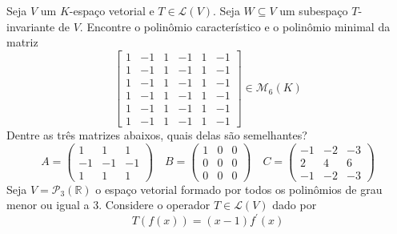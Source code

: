 \documentclass[11pt,a4paper]{article}
\begin{document}
 Seja $V$ um $K$-espaço vetorial e $T \in \mathcal{L}(V).$ Seja $W \subseteq V$ um subespaço $T$-invariante de $V.$
\solucao{}
 Encontre o polinômio característico e o polinômio minimal da matriz
\[
\begin{bmatrix}
1 & -1 & 1 & -1 & 1 & -1 \\
1 & -1 & 1 & -1 & 1 & -1 \\
1 & -1 & 1 & -1 & 1 & -1 \\
1 & -1 & 1 & -1 & 1 & -1 \\
1 & -1 & 1 & -1 & 1 & -1 \\
1 & -1 & 1 & -1 & 1 & -1
\end{bmatrix} \in \mathcal{M}_6(K)
\]
\solucao{}
 Dentre as três matrizes abaixos, quais delas são semelhantes?
\[
A = \begin{pmatrix}
1 & 1 & 1 \\
-1& -1 & -1 \\
1 & 1 & 1
\end{pmatrix}  \quad B = \begin{pmatrix}
1 & 0 & 0 \\
0& 0 & 0 \\
0 & 0 &0
\end{pmatrix} \quad C = \begin{pmatrix}
-1 & -2 & -3 \\
2& 4 & 6 \\
-1& -2 &-3
\end{pmatrix}
\]
\solucao{}
 Seja $V = \mathcal{P}_3(\mathbb{R})$ o espaço vetorial formado por todos os polinômios de grau menor ou igual a $3.$ Considere o operador $T \in \mathcal{L}(V)$ dado por
\[
T(f(x)) = (x-1) f^{\prime}(x)
\]
 
\end{document}
